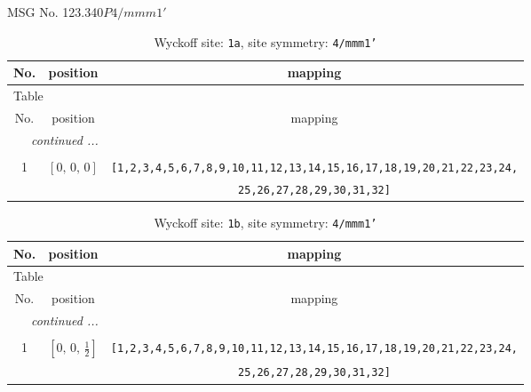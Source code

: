 \documentclass[fleqn,8pt]{jsarticle}
\begin{document}
\setcounter{MaxMatrixCols}{32}

\renewcommand{\tablename}{Table~}
\renewcommand{\figurename}{Figure~}
\begin{center}
\LARGE
MSG No. 123.340\quad$P4/mmm1'$
\end{center}
\renewcommand{\arraystretch}{1.2}
\begin{longtable}{ccc}
\caption{Wyckoff site: {\tt 1a}, site symmetry: {\tt 4/mmm1'}}
 \\
 \hline \hline
No. & position & mapping \\ \hline \endfirsthead

\multicolumn{2}{l}{\tablename\ \thetable{}} \\
 \hline \hline
No. & position & mapping \\ \hline \endhead

 \hline \hline
\multicolumn{2}{r}{\footnotesize\it continued ...} \\ \endfoot

 \hline \hline
\multicolumn{2}{r}{} \\ \endlastfoot

1 & $\left[ 0,\, 0,\, 0 \right]$ & {\tt [1,2,3,4,5,6,7,8,9,10,11,12,13,14,15,16,17,18,19,20,21,22,23,24,} \\ \hline
 &  & {\tt 25,26,27,28,29,30,31,32]} \\
\end{longtable}
\renewcommand{\arraystretch}{1.2}
\begin{longtable}{ccc}
\caption{Wyckoff site: {\tt 1b}, site symmetry: {\tt 4/mmm1'}}
 \\
 \hline \hline
No. & position & mapping \\ \hline \endfirsthead

\multicolumn{2}{l}{\tablename\ \thetable{}} \\
 \hline \hline
No. & position & mapping \\ \hline \endhead

 \hline \hline
\multicolumn{2}{r}{\footnotesize\it continued ...} \\ \endfoot

 \hline \hline
\multicolumn{2}{r}{} \\ \endlastfoot

1 & $\left[ 0,\, 0,\, \frac{1}{2} \right]$ & {\tt [1,2,3,4,5,6,7,8,9,10,11,12,13,14,15,16,17,18,19,20,21,22,23,24,} \\ \hline
 &  & {\tt 25,26,27,28,29,30,31,32]} \\
\end{longtable}
\end{document}
